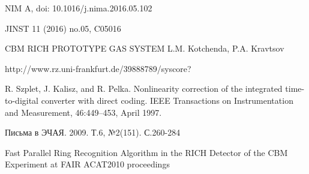 \begin{thebibliography}{99}
NIM A, doi: 10.1016/j.nima.2016.05.102

JINST 11 (2016) no.05, C05016

CBM RICH PROTOTYPE GAS SYSTEM
L.M. Kotchenda, P.A. Kravtsov


http://www.rz.uni-frankfurt.de/39888789/syscore?



R. Szplet, J. Kalisz, and R. Pelka. Nonlinearity correction of the integrated time-to-digital converter with direct coding. IEEE Transactions on Instrumentation and Measurement, 46:449–453, April 1997.

Письма в ЭЧАЯ. 2009. Т.6, №2(151). С.260-284

Fast Parallel Ring Recognition Algorithm in the RICH Detector of the CBM Experiment at FAIR
ACAT2010 proceedings

\end{thebibliography}
